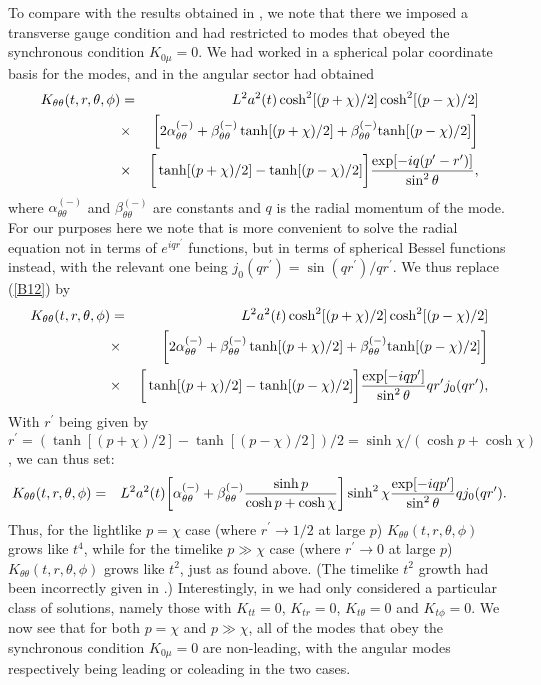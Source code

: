 \documentclass[aps]{revtex4}
\begin{document}
To compare with the results obtained in \cite{Mannheim2012a}, we note that there we imposed a  transverse gauge condition and had restricted to modes that obeyed the synchronous condition $K_{0\mu}=0$. We had worked in a spherical polar coordinate basis for the modes, and in the angular sector had obtained 
%
\begin{eqnarray}
K_{\theta\theta}(t,r,\theta,\phi)&=&L^2a^2(t)\cosh^2[(p+\chi)/2]\cosh^2[(p-\chi)/2]
\nonumber \\
&\times&\bigg{[}2\alpha^{(-)}_{\theta\theta}+\beta^{(-)}_{\theta\theta}\tanh[(p+\chi)/2]+\beta^{(-)}_{\theta\theta}{\rm tanh}[(p-\chi)/2]\bigg{]}
\nonumber\\
&\times&\bigg{[}\tanh[(p+\chi)/2]-\tanh[(p-\chi)/2]\bigg{]}\frac{\exp[-iq(p^{\prime}-r^{\prime})]}{\sin^2\theta},
\label{B12}
\end{eqnarray}
%
where $\alpha^{(-)}_{\theta\theta}$ and $\beta^{(-)}_{\theta\theta}$ are constants and $q$ is the radial momentum of the mode. For our purposes here we note that is more convenient to solve the radial equation not in terms of $e^{iqr^{\prime}}$ functions, but in terms of spherical Bessel functions instead, with the relevant one being $j_0(qr^{\prime})=\sin(qr^{\prime})/qr^{\prime}$. We thus replace (\ref{B12}) by
%
\begin{eqnarray}
K_{\theta\theta}(t,r,\theta,\phi)&=&L^2a^2(t)\cosh^2[(p+\chi)/2]\cosh^2[(p-\chi)/2]
\nonumber \\
&\times&\bigg{[}2\alpha^{(-)}_{\theta\theta}+\beta^{(-)}_{\theta\theta}\tanh[(p+\chi)/2]+\beta^{(-)}_{\theta\theta}{\rm tanh}[(p-\chi)/2]\bigg{]}
\nonumber\\
&\times&\bigg{[}\tanh[(p+\chi)/2]-\tanh[(p-\chi)/2]\bigg{]}\frac{\exp[-iqp^{\prime}]}{\sin^2\theta}qr^{\prime}j_0(qr^{\prime}),
\label{B13}
\end{eqnarray}
%
With $r^{\prime}$ being given by $r^{\prime}=(\tanh[(p+\chi)/2]-\tanh[(p-\chi)/2])/2=\sinh\chi/(\cosh p+\cosh \chi)$,  we can thus set: 
%
\begin{eqnarray}
K_{\theta\theta}(t,r,\theta,\phi)&=&L^2a^2(t)\bigg{[}\alpha^{(-)}_{\theta\theta}
+\beta^{(-)}_{\theta\theta}\frac{\sinh p}{\cosh p +\cosh \chi}\bigg{]}\sinh^2\chi\frac{\exp[-iqp^{\prime}]}{\sin^2\theta}qj_0(qr^{\prime}).
\label{B14}
\end{eqnarray}
%
Thus, for the lightlike $p=\chi$ case (where $r^{\prime}\rightarrow 1/2$ at large $p$) $K_{\theta\theta}(t,r,\theta,\phi)$ grows like $t^4$, while for the timelike $p\gg \chi$ case (where $r^{\prime}\rightarrow 0$ at large $p$) $K_{\theta\theta}(t,r,\theta,\phi)$ grows like $t^2$, just as found above. (The timelike $t^2$ growth had been incorrectly given in \cite{Mannheim2012a}.) Interestingly, in \cite{Mannheim2012a}  we had only considered a particular class of solutions, namely those with $K_{tt}=0$, $K_{tr}=0$, $K_{t\theta}=0$ and $K_{t\phi}=0$. We now see that for both $p=\chi$ and $p \gg \chi$, all of the modes that obey the synchronous condition $K_{0\mu}=0$  are non-leading, with the angular modes respectively being leading or coleading in the two cases.
\end{document}
